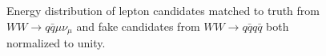 \begin{figure}
\begin{minipage}{0.48\textwidth}
\caption{Energy distribution of lepton candidates matched to truth from $WW \rightarrow q \bar{q} \mu \nu_\mu $ and fake candidates from $ WW \rightarrow q\bar{q} q \bar{q}$ both normalized to unity.}
\label{fig:candE}
\end{minipage}
\end{figure}



